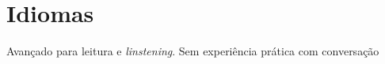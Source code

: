 \section{Idiomas}
{Avançado para leitura e \emph{linstening}. Sem experiência prática com conversação}
